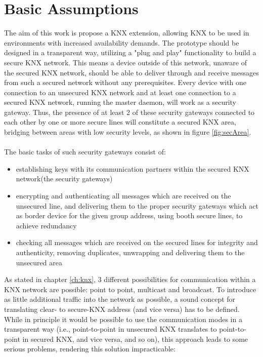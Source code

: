 \section{Basic Assumptions}

The aim of this work is propose a KNX extension, allowing KNX to be used in environments with increased availability demands. The prototype should be designed
in a transparent way, utilizing a "plug and play" functionality to build a secure KNX network.
This means a device outside of this network, unaware of
the secured KNX network, should be able to deliver through and receive messages from such a secured network without any prerequisites. 
Every device with one connection to an unsecured KNX network and at least one connection to a secured KNX network, running the master daemon, will work
as a security gateway. Thus, the presence of at least 2 of these security gateways connected to each other by one or more secure lines will constitute a 
secured KNX area, bridging between areas with low security levels, as shown in figure \ref{fig:secArea}.
\\
\\
The basic tasks of such security gateways consist of:
\begin{itemize}
 \item establishing keys with its communication partners within the secured KNX network(the security gateways)
 \item encrypting and authenticating all messages which are received on the unsecured line, and delivering them to the proper security gateways which act as border device for 
 the given group address, using booth secure lines, to achieve redundancy
 \item checking all messages which are received on the secured lines for integrity and authenticity, removing duplicates, unwrapping and delivering them to
 the unsecured area
\end{itemize}
As stated in chapter \ref{ch:knx}, 3 different possibilities for communication within a KNX network are possible: point to point, multicast and broadcast.
To introduce as little additional traffic into the network as possible, a sound concept for translating clear- to secure-KNX address (and vice versa) has to
be defined. While in principle it would be possible to use the communication modes in a transparent way (i.e., point-to-point in unsecured KNX translates
to point-to-point in secured KNX, and vice versa, and so on), this approach leads to some serious problems, rendering this solution impracticable:

